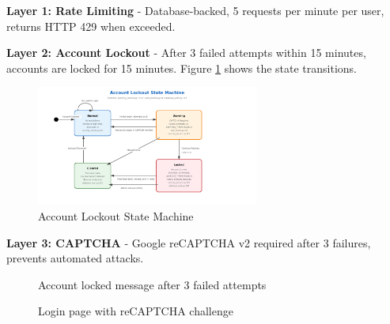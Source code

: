 \documentclass[12pt,a4paper]{article}
\begin{document}
\textbf{Layer 1: Rate Limiting} - Database-backed, 5 requests per minute per user, returns HTTP 429 when exceeded.

\textbf{Layer 2: Account Lockout} - After 3 failed attempts within 15 minutes, accounts are locked for 15 minutes. Figure \ref{fig:lockout_state} shows the state transitions.

\begin{figure}[H]
    \centering
    \includegraphics[width=0.65\textwidth]{diagrams/13_account_lockout_state_machine.pdf}
    \caption{Account Lockout State Machine}
    \label{fig:lockout_state}
\end{figure}

\textbf{Layer 3: CAPTCHA} - Google reCAPTCHA v2 required after 3 failures, prevents automated attacks.

\begin{figure}[H]
    \centering
    \caption{Account locked message after 3 failed attempts}
    \label{fig:lockout_screen}
\end{figure}

\begin{figure}[H]
    \centering
    \caption{Login page with reCAPTCHA challenge}
    \label{fig:captcha}
\end{figure}
\end{document}
